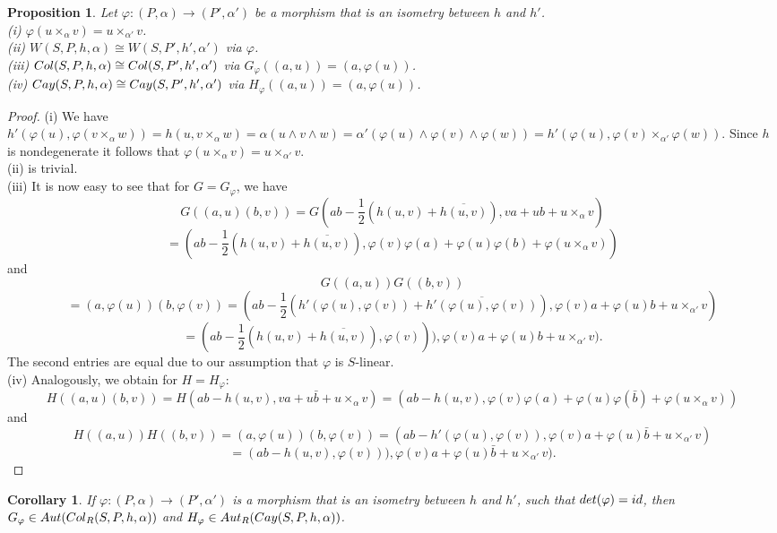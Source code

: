 \documentclass[10pt]{amsart}
\theoremstyle{plain}
\newtheorem{proposition}[theorem]{Proposition}
\newtheorem{corollary}[theorem]{Corollary}
\theoremstyle{definition}
\begin{document}
 \begin{proposition}
 Let $ \varphi:(P,\alpha)\rightarrow (P',\alpha') $
 be a morphism that is an isometry between $h$ and $h'$.
\\ (i)  $\varphi(u\times_{\alpha}v)=u\times_{\alpha'}v$.
 \\ (ii)  $W(S,P,h,\alpha)\cong W(S, P',h',\alpha')$
 via $\varphi$.
\\ (iii)  ${\rm Col}(S, P,h,\alpha)\cong {\rm Col}(S, P',h',\alpha')$
 via $G_\varphi((a,u))=(a,\varphi(u))$.
 \\ (iv)
 ${\rm Cay}(S,P,h,\alpha)\cong {\rm Cay}(S, P',h',\alpha')$
 via $H_\varphi((a,u))=(a,\varphi(u))$.
\end{proposition}

\begin{proof}
(i) We have
$h'(\varphi(u), \varphi(v\times_\alpha w) )=h(u,v\times_\alpha w )= \alpha(u\wedge v\wedge w)=\alpha'(\varphi(u) \wedge \varphi(v)\wedge \varphi(w))=h'(\varphi(u), \varphi(v)\times_{\alpha'} \varphi(w)).$
Since $h$ is nondegenerate it follows that $\varphi(u\times_{\alpha}v)=u\times_{\alpha'}v$.
\\ (ii)  is trivial.
\\ (iii) It is now easy to see that for $G=G_\varphi$, we have
$$G((a,u)(b,v))=G(ab-\frac{1}{2}(h(u,v)+\overline{h(u,v)}), va+u b+u\times_{\alpha}v)$$
$$= (ab-\frac{1}{2}(h(u,v)+\overline{h(u,v)}), \varphi(v)\varphi(a)+\varphi(u) \varphi( b)+\varphi(u\times_{\alpha}v))$$
and
$$G((a,u))G((b,v))$$
$$=(a,\varphi(u))(b,\varphi(v))=(ab-\frac{1}{2}(h'(\varphi(u),\varphi(v))+\overline{h'(\varphi(u),\varphi(v))}), \varphi(v)a+ \varphi(u) b+u\times_{\alpha'} v)$$
$$=(ab-\frac{1}{2}(h(u,v)+\overline{ h(u,v)}),\varphi(v))), \varphi(v)a+ \varphi(u) b+u\times_{\alpha'}v).$$
The second entries are equal due to our assumption that $\varphi$ is $S$-linear.
\\ (iv)
Analogously, we obtain  for $H=H_\varphi$:
$$H((a,u)(b,v))=H(ab-h(u,v), va+u \bar b+u\times_{\alpha}v)= (ab-h(u,v), \varphi(v)\varphi(a)+\varphi(u) \varphi( \bar b)+\varphi(u\times_{\alpha}v))$$
and
$$H((a,u))H((b,v))=(a,\varphi(u))(b,\varphi(v))=(ab-h'(\varphi(u),\varphi(v)), \varphi(v)a+ \varphi(u) \bar b+u\times_{\alpha'} v)$$
$$=(ab- h(u,v),\varphi(v))), \varphi(v)a+ \varphi(u) \bar b+u\times_{\alpha'}v).$$
\end{proof}

\begin{corollary}\label{cor:4.3}
If  $ \varphi:(P,\alpha)\rightarrow (P',\alpha') $
 is a morphism that is an isometry between $h$ and $h'$, such that ${\rm det}(\varphi)=id$, then
$G_\varphi \in {\rm Aut}({\rm Col}_R(S, P, h,\alpha))$ and $H_\varphi \in{\rm Aut}_R({\rm Cay}(S, P, h,\alpha))$.
\end{corollary}
\end{document}
